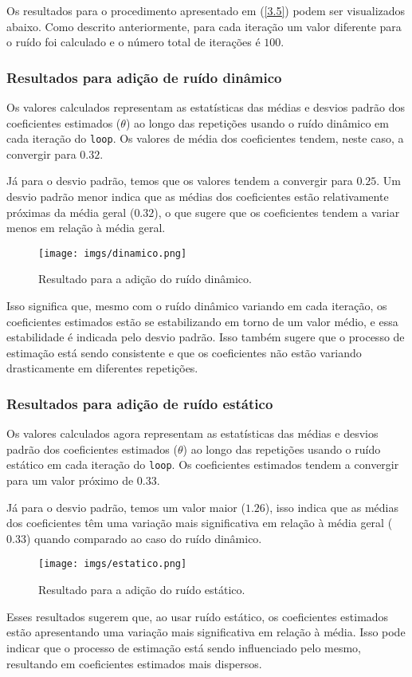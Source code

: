 \documentclass[a4paper,12pt]{article}
\begin{document}
Os resultados para o procedimento apresentado em (\ref{3.5}) podem ser visualizados abaixo. Como descrito anteriormente, para cada iteração um valor diferente para o ruído foi calculado e o número total de iterações é $100$.

\subsubsection{Resultados para adição de ruído dinâmico}

Os valores calculados representam as estatísticas das médias e desvios padrão dos coeficientes estimados ($\theta$) ao longo das repetições usando o ruído dinâmico em cada iteração do \texttt{loop}. Os valores de média dos coeficientes tendem, neste caso, a convergir para $0.32$. 

Já para o desvio padrão, temos que os valores tendem a convergir para  $0.25$. Um desvio padrão menor indica que as médias dos coeficientes estão relativamente próximas da média geral ($0.32$), o que sugere que os coeficientes tendem a variar menos em relação à média geral.
\begin{figure}[h!]\label{fig16}
  \centering
  \texttt{[image: imgs/dinamico.png]}
  \caption{Resultado para a adição do ruído dinâmico.}
\end{figure}

Isso significa que, mesmo com o ruído dinâmico variando em cada iteração, os coeficientes estimados estão se estabilizando em torno de um valor médio, e essa estabilidade é indicada pelo desvio padrão. Isso também sugere que o processo de estimação está sendo consistente e que os coeficientes não estão variando drasticamente em diferentes repetições.

\subsubsection{Resultados para adição de ruído estático}

Os valores calculados agora representam as estatísticas das médias e desvios padrão dos coeficientes estimados ($\theta$) ao longo das repetições usando o ruído estático em cada iteração do \texttt{loop}. Os coeficientes estimados tendem a convergir para um valor próximo de $0.33$.

Já para o desvio padrão, temos um valor maior ($1.26$), isso indica que as médias dos coeficientes têm uma variação mais significativa em relação à média geral ($0.33$) quando comparado ao caso do ruído dinâmico.
\begin{figure}[h!]\label{fig17}
  \centering
  \texttt{[image: imgs/estatico.png]}
  \caption{Resultado para a adição do ruído estático.}
\end{figure}
\newpage
Esses resultados sugerem que, ao usar ruído estático, os coeficientes estimados estão apresentando uma variação mais significativa em relação à média. Isso pode indicar que o processo de estimação está sendo influenciado pelo mesmo, resultando em coeficientes estimados mais dispersos. 
\end{document}
